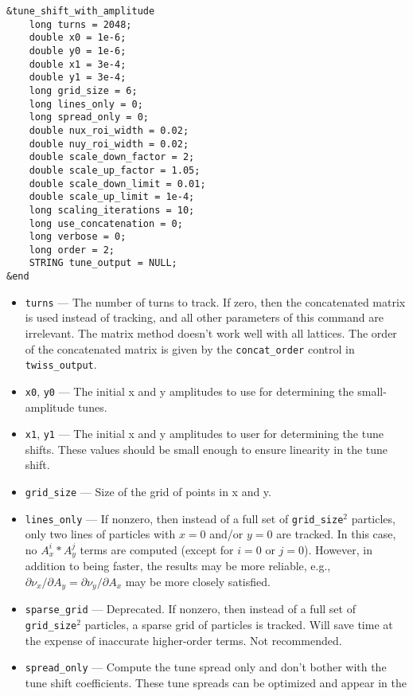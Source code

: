 \documentclass[11pt]{article}
\begin{document}
\begin{verbatim}
&tune_shift_with_amplitude
    long turns = 2048;
    double x0 = 1e-6;
    double y0 = 1e-6;
    double x1 = 3e-4;
    double y1 = 3e-4;
    long grid_size = 6;
    long lines_only = 0;
    long spread_only = 0;
    double nux_roi_width = 0.02;
    double nuy_roi_width = 0.02;
    double scale_down_factor = 2;
    double scale_up_factor = 1.05;
    double scale_down_limit = 0.01;
    double scale_up_limit = 1e-4;
    long scaling_iterations = 10;
    long use_concatenation = 0;
    long verbose = 0;
    long order = 2;
    STRING tune_output = NULL;
&end
\end{verbatim}

\begin{itemize}
\item \verb|turns| --- The number of turns to track.  If zero, then the concatenated matrix
        is used instead of tracking, and all other parameters of this command are irrelevant.  
        The matrix method doesn't work well with all lattices.  The order
        of the concatenated matrix is given by the \verb|concat_order| control in 
        \verb|twiss_output|.
\item \verb|x0|, \verb|y0| --- The initial x and y amplitudes to use for determining the
        small-amplitude tunes.
\item \verb|x1|, \verb|y1| --- The initial x and y amplitudes to user for determining the
        tune shifts.  These values should be small enough to ensure linearity in the tune
        shift.  
\item \verb|grid_size| --- Size of the grid of points in x and y.  
\item \verb|lines_only| --- If nonzero, then instead of a full set of \verb|grid_size|$^2$
  particles, only two lines of particles with $x=0$ and/or $y=0$ are tracked.  In this
  case, no $A_x^i*A_y^j$ terms are computed (except for $i=0$ or $j=0$).  However, in addition
  to being faster, the results may be more reliable, e.g., $\partial \nu_x/\partial A_y = 
  \partial \nu_y/\partial A_x$ may be more closely satisfied.
\item \verb|sparse_grid| --- Deprecated. If nonzero, then instead of a full set of \verb|grid_size|$^2$
        particles, a sparse grid of particles is tracked.  Will save time at the expense of
        inaccurate higher-order terms. Not recommended.
\item \verb|spread_only| --- Compute the tune spread only and don't bother with the
        tune shift coefficients.  These tune spreads can be optimized and appear in the

\end{itemize}
\end{document}
